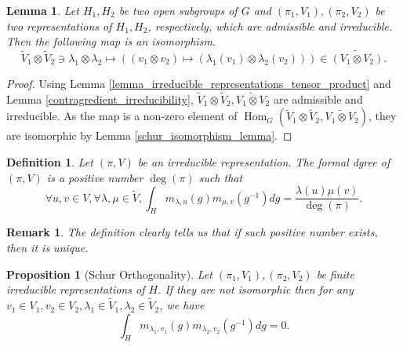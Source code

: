 \documentclass[8pt]{article}
\newtheorem{proposition}{Proposition}[section]
\newtheorem{definition}{Definition}[section]
\newtheorem{lemma}{Lemma}[section]
\newtheorem{remark}{Remark}[section]
\DeclareMathOperator{\Hom}{Hom}
\begin{document}
\begin{lemma}
  Let $H_1,H_2$ be two open subgroups of $G$ and $(\pi_1,V_1),(\pi_2,V_2)$ be two representations of $H_1,H_2$, respectively, which are admissible and irreducible. 
  Then the following map is an isomorphism.
  \begin{equation*}
    \widetilde{V}_1\otimes\widetilde{V}_2\ni\lambda_1\otimes\lambda_2\mapsto((v_1\otimes v_2)\mapsto(\lambda_1(v_1)\otimes\lambda_2(v_2)))\in\widetilde{(V_1\otimes V_2)}.
  \end{equation*}
  \label{tensor_contragredient_commutativity}
\end{lemma}

\begin{proof}
Using Lemma \ref{lemma_irreducible_representations_tensor_product} and Lemma \ref{contragredient_irreducibility}, $\widetilde{V}_1\otimes\widetilde{V}_2,\widetilde{V_1\otimes V_2}$ are  admissible and irreducible. As the map is a non-zero element of $\Hom_G(\widetilde{V}_1\otimes\widetilde{V}_2,\widetilde{V_1\otimes V_2})$, they are isomorphic by Lemma \ref{schur_isomorphism_lemma}.
\end{proof}

\begin{definition}
  Let $(\pi,V)$ be an irreducible representation. The formal dgree of $(\pi,V)$ is a positive number $\deg(\pi)$ such that 
  \begin{equation*}
    \forall u,v\in V,\forall \lambda,\mu\in\widetilde{V}, \int_H m_{\lambda,u}(g)m_{\mu,v}(g^{-1})dg = {\frac {\lambda(u)\mu(v)} {\deg(\pi)}}.
  \end{equation*}
\end{definition}

\begin{remark}
  The definition clearly tells us that if such positive number exists, then it is unique.
\end{remark}

\begin{proposition}[Schur Orthogonality]
  Let $(\pi_1,V_1),(\pi_2,V_2)$ be finite irreducible representations of $H$. If they are not isomorphic then for any $v_1\in V_1,v_2\in V_2,\lambda_1\in\widetilde{V}_1,\lambda_2\in\widetilde{V}_2$, we have
  \begin{equation*}
    \int_Hm_{\lambda_1,v_1}(g)m_{\lambda_2,v_2}(g^{-1})dg = 0.
  \end{equation*}
  \label{schur_orthogonality}
\end{proposition}
\end{document}
